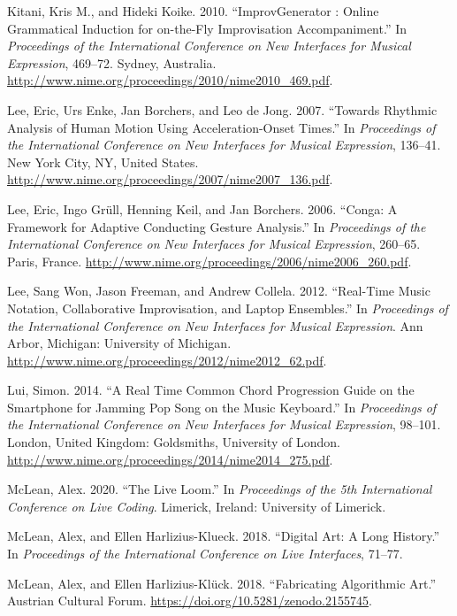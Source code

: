 \documentclass{nime-alternate} %
\newlength{\cslhangindent}
\newenvironment{cslreferences}%
  {\setlength{\parindent}{0pt}%
  \everypar{\setlength{\hangindent}{\cslhangindent}}\ignorespaces}%
  {\par}
\begin{document}
\begin{cslreferences}
\leavevmode\hypertarget{ref-Kitani2010}{}%
Kitani, Kris M., and Hideki Koike. 2010. ``ImprovGenerator : Online
Grammatical Induction for on-the-Fly Improvisation Accompaniment.'' In
\emph{Proceedings of the International Conference on New Interfaces for
Musical Expression}, 469--72. Sydney, Australia.
\url{http://www.nime.org/proceedings/2010/nime2010_469.pdf}.

\leavevmode\hypertarget{ref-Lee2007}{}%
Lee, Eric, Urs Enke, Jan Borchers, and Leo de Jong. 2007. ``Towards
Rhythmic Analysis of Human Motion Using Acceleration-Onset Times.'' In
\emph{Proceedings of the International Conference on New Interfaces for
Musical Expression}, 136--41. New York City, NY, United States.
\url{http://www.nime.org/proceedings/2007/nime2007_136.pdf}.

\leavevmode\hypertarget{ref-Lee2006}{}%
Lee, Eric, Ingo Grüll, Henning Keil, and Jan Borchers. 2006. ``Conga: A
Framework for Adaptive Conducting Gesture Analysis.'' In
\emph{Proceedings of the International Conference on New Interfaces for
Musical Expression}, 260--65. Paris, France.
\url{http://www.nime.org/proceedings/2006/nime2006_260.pdf}.

\leavevmode\hypertarget{ref-Lee:2012a}{}%
Lee, Sang Won, Jason Freeman, and Andrew Collela. 2012. ``Real-Time
Music Notation, Collaborative Improvisation, and Laptop Ensembles.'' In
\emph{Proceedings of the International Conference on New Interfaces for
Musical Expression}. Ann Arbor, Michigan: University of Michigan.
\url{http://www.nime.org/proceedings/2012/nime2012_62.pdf}.

\leavevmode\hypertarget{ref-slui2014}{}%
Lui, Simon. 2014. ``A Real Time Common Chord Progression Guide on the
Smartphone for Jamming Pop Song on the Music Keyboard.'' In
\emph{Proceedings of the International Conference on New Interfaces for
Musical Expression}, 98--101. London, United Kingdom: Goldsmiths,
University of London.
\url{http://www.nime.org/proceedings/2014/nime2014_275.pdf}.

\leavevmode\hypertarget{ref-mclean_live_2020}{}%
McLean, Alex. 2020. ``The Live Loom.'' In \emph{Proceedings of the 5th
International Conference on Live Coding}. Limerick, Ireland: University
of Limerick.

\leavevmode\hypertarget{ref-McLean18}{}%
McLean, Alex, and Ellen Harlizius-Klueck. 2018. ``Digital Art: A Long
History.'' In \emph{Proceedings of the International Conference on Live
Interfaces}, 71--77.

\leavevmode\hypertarget{ref-McLean18b}{}%
McLean, Alex, and Ellen Harlizius-Klück. 2018. ``Fabricating Algorithmic
Art.'' Austrian Cultural Forum.
\url{https://doi.org/10.5281/zenodo.2155745}.


\end{cslreferences}
\end{document}
